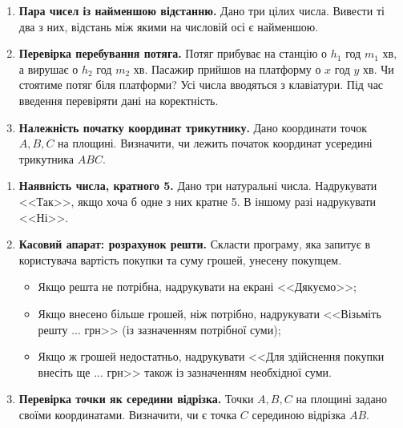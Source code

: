 	{\large
		\begin{enumerate}
			\item \textbf{Пара чисел із найменшою відстанню.} Дано три цілих числа. Вивести ті два з них, відстань між якими на числовій осі є найменшою.
			\item \textbf{Перевірка перебування потяга.} Потяг прибуває на станцію о $h_1$ год $m_1$ хв, а вирушає о $h_2$ год $m_2$ хв. Пасажир прийшов на платформу о $x$ год $y$ хв. Чи стоятиме потяг біля платформи? Усі числа вводяться з клавіатури. Під час введення перевіряти дані на коректність.
			\item \textbf{Належність початку координат трикутнику.} Дано координати точок $A, B, C$ на площині. Визначити, чи лежить початок координат усередині трикутника $ABC$.
		\end{enumerate}
	}
	
	
	
	
	{\large
		\begin{enumerate}
			\item \textbf{Наявність числа, кратного 5.} Дано три натуральні числа. Надрукувати <<Так>>, якщо хоча б одне з них кратне 5. В іншому разі надрукувати <<Ні>>.
			\item \textbf{Касовий апарат: розрахунок решти.} Скласти програму, яка запитує в користувача вартість покупки та суму грошей, унесену покупцем.
			\begin{itemize}
				\item Якщо решта не потрібна, надрукувати на екрані <<Дякуємо>>;
				\item Якщо внесено більше грошей, ніж потрібно, надрукувати <<Візьміть решту ... грн>> (із зазначенням потрібної суми);
				\item Якщо ж грошей недостатньо, надрукувати <<Для здійснення покупки внесіть ще ... грн>> також із зазначенням необхідної суми.
			\end{itemize}
			\item \textbf{Перевірка точки як середини відрізка.} Точки $A, B, C$ на площині задано своїми координатами. Визначити, чи є точка $C$ серединою відрізка $AB$.
		\end{enumerate}
	}
	
	\vspace{2cm}
	
	
